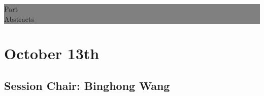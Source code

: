 \documentclass[oneside,A4paper,12pt]{article}
\begin{document}
\newpage



\begin{titlepage} %
	
	
	\colorbox{grey}{
		\parbox[t]{0.93\textwidth}{ %
			\parbox[t]{0.91\textwidth}{ %
				\raggedleft %
				\fontsize{50pt}{80pt}\selectfont %
				\vspace{0.7cm} %
				
				Part \uppercase\expandafter{}\\
				Abstracts\\
				
				\vspace{0.7cm} %
			}
		}
	}
	
	\vfill %
	
	
	
\end{titlepage}


\section*{October 13th}
\label{sec:org7bdd1e5}
\subsection*{Session \uppercase\expandafter{}  \hspace{10mm} Chair: Binghong Wang}
\label{sec:orgc1fc46f}
\end{document}
